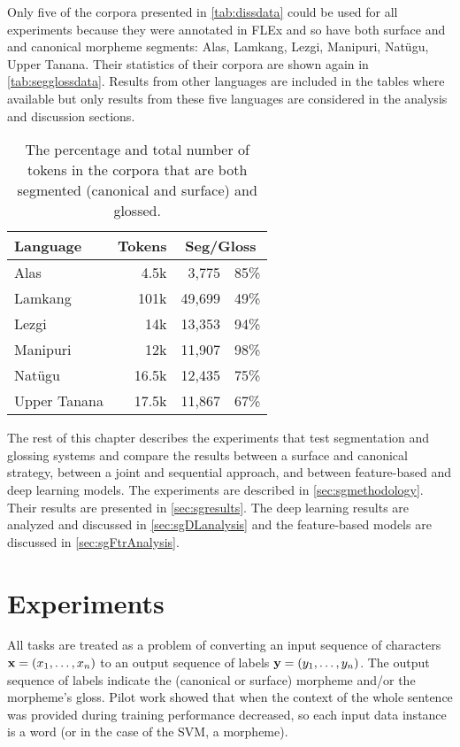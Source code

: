 Only five of the corpora presented in \autoref{tab:dissdata} could be used for all experiments because they were annotated in FLEx and so have both surface and and canonical morpheme segments: Alas, Lamkang, Lezgi, Manipuri, Nat\"ugu, Upper Tanana. Their statistics of their corpora are shown again in \autoref{tab:segglossdata}. Results from other languages are included in the tables where available but only results from these five languages are considered in the analysis and discussion sections. 

\begin{table}[!tb]
    \centering
    \begin{tabular}{l|r|rc}
         \textbf{Language} & \textbf{Tokens} & \multicolumn{2}{c}{\textbf{Seg/Gloss}} \\
         \hline
         Alas & 4.5k & 3,775 & 85\%  \\
         \hline
         Lamkang & 101k & 49,699 & 49\% \\
         \hline
         Lezgi & 14k & 13,353  & 94\% \\
         \hline
         Manipuri & 12k & 11,907 & 98\% \\
         \hline
         Natügu & 16.5k & 12,435 & 75\%  \\
         \hline
         Upper Tanana & 17.5k & 11,867 & 67\% 
    \end{tabular}
    \caption[Data for Segmentation and Glossing Experimentation]{The percentage and total number of tokens in the corpora that are both segmented (canonical and surface) and glossed.}
    \label{tab:segglossdata}
\end{table}

The rest of this chapter describes the experiments that test segmentation and glossing systems and compare the results between a surface and canonical strategy, between a joint and sequential approach, and between feature-based and deep learning models. The experiments are described in \autoref{sec:sgmethodology}. Their results are presented in \autoref{sec:sgresults}. The deep learning results are analyzed and discussed in \autoref{sec:sgDLanalysis} and the feature-based models are discussed in \autoref{sec:sgFtrAnalysis}. 


\section{Experiments}
\label{sec:sgmethodology}

All tasks are treated as a problem of converting an input sequence of characters $\mathbf{x} = (x_1, \ldots, x_n)$ to an output sequence of labels $\mathbf{y} = (y_1, \ldots, y_n)$. The output sequence of labels indicate the (canonical or surface) morpheme and/or the morpheme's gloss. Pilot work showed that when the context of the whole sentence was provided during training performance decreased, so each input data instance is a word (or in the case of the SVM, a morpheme). 

